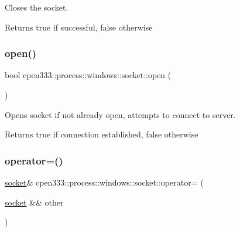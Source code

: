 Closes the socket. 

\begin{DoxyReturn}{Returns}
true if successful, false otherwise 
\end{DoxyReturn}
\mbox{\label{classcpen333_1_1process_1_1windows_1_1socket_a6d75767fbb202435906eac08a0e63c28}} 
\subsubsection{\texorpdfstring{open()}{open()}}
{\footnotesize\ttfamily bool cpen333\+::process\+::windows\+::socket\+::open (\begin{DoxyParamCaption}{ }\end{DoxyParamCaption})\hspace{0.3cm}{\ttfamily [inline]}}



Opens socket if not already open, attempts to connect to server. 

\begin{DoxyReturn}{Returns}
true if connection established, false otherwise 
\end{DoxyReturn}
\mbox{\label{classcpen333_1_1process_1_1windows_1_1socket_a7dadeabcad5dc6a98ead4d7053f9446c}} 
\subsubsection{\texorpdfstring{operator=()}{operator=()}}
{\footnotesize\ttfamily \hyperlink{classcpen333_1_1process_1_1windows_1_1socket}{socket}\& cpen333\+::process\+::windows\+::socket\+::operator= (\begin{DoxyParamCaption}\item[{\hyperlink{classcpen333_1_1process_1_1windows_1_1socket}{socket} \&\&}]{other }\end{DoxyParamCaption})\hspace{0.3cm}{\ttfamily [inline]}}



